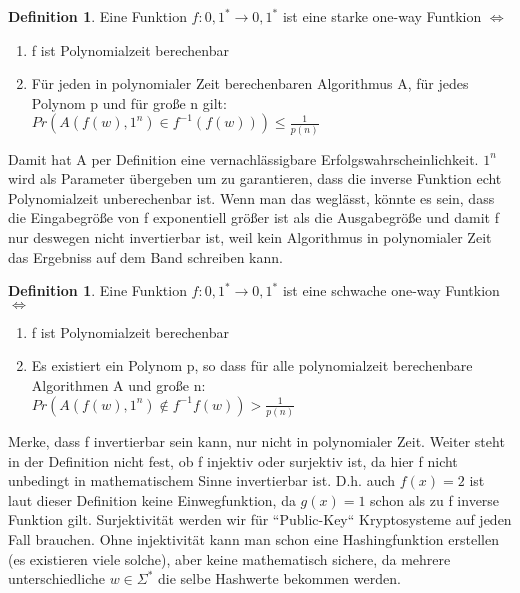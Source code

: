 \documentclass[12pt,a4paper]{article}
\theoremstyle{definition}
\newtheorem{definition}[theorem]{Definition}
\begin{document}
    \begin{definition}
        Eine Funktion $f: {0, 1}^* \longrightarrow {0, 1}^*$ ist eine starke one-way Funtkion $\Leftrightarrow$
        \begin{enumerate}
            \item f ist Polynomialzeit berechenbar
            \item Für jeden in polynomialer Zeit berechenbaren Algorithmus A, für jedes Polynom p und für große n gilt: \\
            $Pr(A(f(w), 1^n) \in f^{-1}(f(w))) \leq \frac{1}{p(n)}$
        \end{enumerate}

        Damit hat A per Definition eine vernachlässigbare Erfolgswahrscheinlichkeit. $1^n$ wird als Parameter übergeben um zu
        garantieren, dass die inverse Funktion echt Polynomialzeit unberechenbar ist. Wenn man das weglässt, könnte es sein,
        dass die Eingabegröße von f exponentiell größer ist als die Ausgabegröße und damit f nur deswegen nicht invertierbar
        ist, weil kein Algorithmus in polynomialer Zeit das Ergebniss auf dem Band schreiben kann.
    \end{definition}



    \begin{definition}
        Eine Funktion $f: {0, 1}^* \longrightarrow {0, 1}^*$ ist eine schwache one-way Funtkion $\Leftrightarrow$
        \begin{enumerate}
            \item f ist Polynomialzeit berechenbar
            \item Es existiert ein Polynom p, so dass für alle polynomialzeit berechenbare Algorithmen A und große n: \\
            $Pr(A(f(w), 1^n) \notin f^{-1}f(w)) > \frac{1}{p(n)}$
        \end{enumerate}

    \end{definition}

    Merke, dass f invertierbar sein kann, nur nicht in polynomialer Zeit. Weiter steht in der Definition nicht fest,
    ob f injektiv oder surjektiv ist, da hier f nicht unbedingt in mathematischem Sinne invertierbar ist. D.h. auch
    $f(x) = 2$ ist laut dieser Definition keine Einwegfunktion, da $g(x) = 1$ schon als zu f inverse Funktion gilt.
    Surjektivität werden wir für ``Public-Key`` Kryptosysteme auf jeden Fall brauchen. Ohne injektivität kann man schon
    eine Hashingfunktion erstellen (es existieren viele solche), aber keine mathematisch sichere, da mehrere
    unterschiedliche $w \in \Sigma^*$ die selbe Hashwerte bekommen werden.
\end{document}
